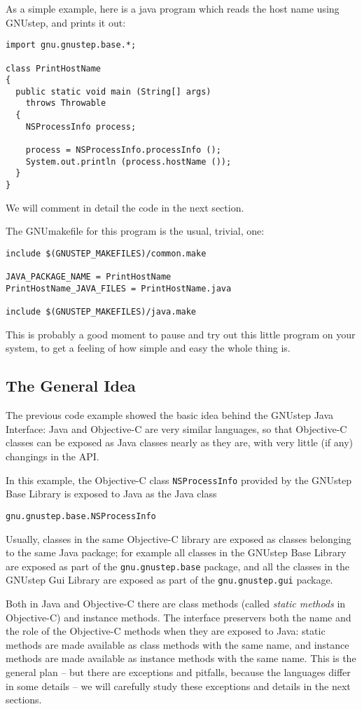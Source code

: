 As a simple example, here is a java program which reads the host name
using GNUstep, and prints it out:
\begin{verbatim}
import gnu.gnustep.base.*;

class PrintHostName
{ 
  public static void main (String[] args) 
    throws Throwable
  {
    NSProcessInfo process;

    process = NSProcessInfo.processInfo ();
    System.out.println (process.hostName ());
  }
}
\end{verbatim}
We will comment in detail the code in the next section.

The GNUmakefile for this program is the usual, trivial, one:
\begin{verbatim}
include $(GNUSTEP_MAKEFILES)/common.make

JAVA_PACKAGE_NAME = PrintHostName
PrintHostName_JAVA_FILES = PrintHostName.java

include $(GNUSTEP_MAKEFILES)/java.make
\end{verbatim}
This is probably a good moment to pause and try out this little
program on your system, to get a feeling of how simple and easy the
whole thing is.

\subsection{The General Idea}
The previous code example showed the basic idea behind the GNUstep
Java Interface: Java and Objective-C are very similar languages, so
that Objective-C classes can be exposed as Java classes nearly as they
are, with very little (if any) changings in the API.

In this example, the Objective-C class \texttt{NSProcessInfo} provided
by the GNUstep Base Library is exposed to Java as the Java class
\begin{verbatim}
gnu.gnustep.base.NSProcessInfo
\end{verbatim}
Usually, classes in the same Objective-C library are exposed as
classes belonging to the same Java package; for example all classes in
the GNUstep Base Library are exposed as part of the
\texttt{gnu.gnustep.base} package, and all the classes in the GNUstep 
Gui Library are exposed as part of the \texttt{gnu.gnustep.gui}
package.

Both in Java and Objective-C there are class methods (called {\sl static
methods} in Objective-C) and instance methods.  The interface
preservers both the name and the role of the Objective-C methods when
they are exposed to Java: static methods are made available as class
methods with the same name, and instance methods are made available as
instance methods with the same name.  This is the general plan -- but
there are exceptions and pitfalls, because the languages differ in
some details -- we will carefully study these exceptions and details
in the next sections.

